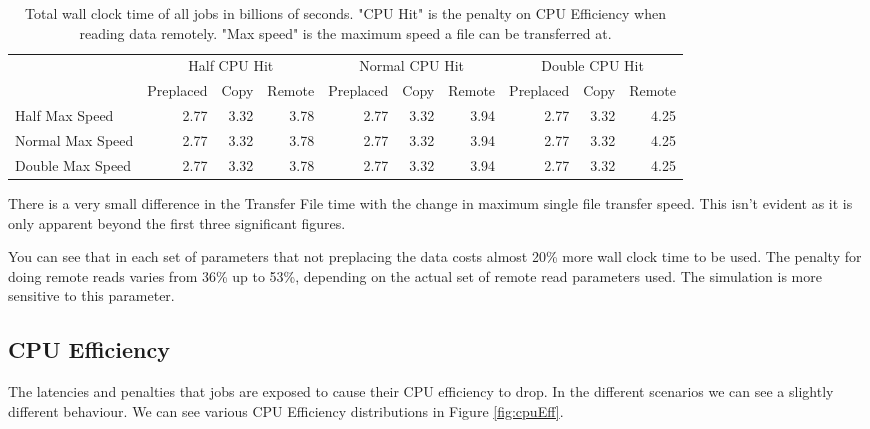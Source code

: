 \documentclass[a4paper]{jpconf}
\begin{document}
\begin{table}
  \begin{center}
    \begin{scriptsize}
      \begin{tabular}{|l|rrr|rrr|rrr|}
        \hline
        & \multicolumn{3}{|c|}{Half CPU Hit} & \multicolumn{3}{|c|}{Normal CPU
          Hit} & \multicolumn{3}{|c|}{Double CPU Hit} \\
        \cline{2-10}
        & Preplaced & Copy & Remote & Preplaced & Copy & Remote
        & Preplaced & Copy & Remote \\
        \hline
        Half Max Speed & 2.77 & 3.32 & 3.78 & 2.77 & 3.32 & 3.94 & 2.77
        & 3.32 & 4.25 \\
        Normal Max Speed & 2.77 & 3.32 & 3.78 & 2.77 & 3.32 & 3.94 & 2.77
        & 3.32 & 4.25 \\
        Double Max Speed & 2.77 & 3.32 & 3.78 & 2.77 & 3.32 & 3.94 & 2.77
        & 3.32 & 4.25 \\
        \hline
      \end{tabular}
      \caption{Total wall clock time of all jobs in billions of seconds\label{tab:wallClock}.
       "CPU Hit" is the penalty on CPU Efficiency when reading data remotely. "Max speed" is
       the maximum speed a file can be transferred at.}
    \end{scriptsize}
  \end{center}
\end{table}

There is a very small difference in the Transfer File time with the
change in maximum single file transfer speed. This isn't evident as it
is only apparent beyond the first three significant figures.

You can see that in each set of parameters that not preplacing the
data costs almost 20\% more wall clock time to be used. The penalty
for doing remote reads varies from 36\% up to 53\%, depending on the
actual set of remote read parameters used. The simulation is more
sensitive to this parameter.

\subsection{CPU Efficiency}

The latencies and penalties that jobs are exposed to cause their CPU
efficiency to drop. In the different scenarios we can see a slightly
different behaviour. We can see various CPU Efficiency distributions in
Figure \ref{fig:cpuEff}.
\end{document}
